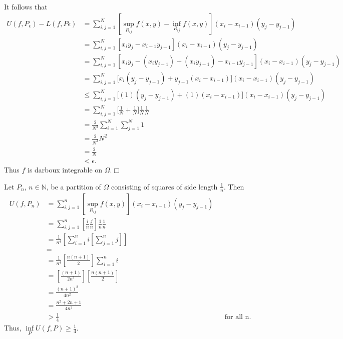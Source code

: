 \documentclass[11pt]{article}
\begin{document}
\noindent It follows that
\begin{align*}
U(f,P_\epsilon)-L(f,P\epsilon)&=\sum\limits_{i,j=1}^N\left[\sup\limits_{R_{ij}}f(x,y)-\inf\limits_{R_{ij}}f(x,y)\right]\left(x_i-x_{i-1}\right)\left(y_j-y_{j-1}\right)\\&=\sum\limits_{i,j=1}^N\left[x_iy_j-x_{i-1}y_{j-1}\right]\left(x_i-x_{i-1}\right)\left(y_j-y_{j-1}\right)\\&=\sum\limits_{i,j=1}^N\left[x_iy_j-\left(x_iy_{j-1}\right)+\left(x_iy_{j-1}\right)-x_{i-1}y_{j-1}\right]\left(x_i-x_{i-1}\right)\left(y_j-y_{j-1}\right)\\&=\sum\limits_{i,j=1}^N\Big[x_i\left(y_j-y_{j-1}\right)+y_{j-1}\left(x_i-x_{i-1}\right)\Big]\left(x_i-x_{i-1}\right)\left(y_j-y_{j-1}\right)\\&\leq \sum\limits_{i,j=1}^N\Big[(1)\left(y_j-y_{j-1}\right)+(1)\left(x_i-x_{i-1}\right)\Big]\left(x_i-x_{i-1}\right)\left(y_j-y_{j-1}\right)\\&=\sum\limits_{i,j=1}^N\Big[\frac{1}{N}+\frac{1}{N}\Big]\frac{1}{N}\frac{1}{N}\\&=\frac{2}{N^3}\sum\limits_{i=1}^N\sum\limits_{j=1}^N1\\&=\frac{2}{N^3}N^2\\&=\frac{2}{N}\\&<\epsilon.
\end{align*}
\noindent Thus $f$ is darboux integrable on $\Omega$.\hfill $\Box$

\vspace{.2in}
 
\noindent Let $P_n$, $n\in\mathbb{N}$, be a partition of $\Omega$ consisting of squares of side length $\frac{1}{n}$. Then
\begin{align*}
U(f,P_n)&=\sum\limits_{i,j=1}^n\left[\sup\limits_{R_{ij}}f(x,y)\right]\left(x_i-x_{i-1}\right)\left(y_j-y_{j-1}\right)\\&=\sum\limits_{i,j=1}^n\left[\frac{i}{n}\frac{j}{n}\right]\frac{1}{n}\frac{1}{n}\\&=\frac{1}{n^4}\left[\sum\limits_{i=1}^ni\left[\sum\limits_{j=1}^nj\right]\right]\\&=\\&=\frac{1}{n^4}\left[\frac{n(n+1)}{2}\right]\sum\limits_{i=1}^ni\\&=\left[\frac{(n+1)}{2n^3}\right]\left[\frac{n(n+1)}{2}\right]\\&=\frac{(n+1)^2}{4n^2}\\&=\frac{n^2+2n+1}{4n^2}\\&>\frac{1}{4}&&\text{for all n.}
\end{align*}
\noindent Thus, $\inf\limits_PU(f,P)\geq \frac{1}{4}$.
\end{document}
